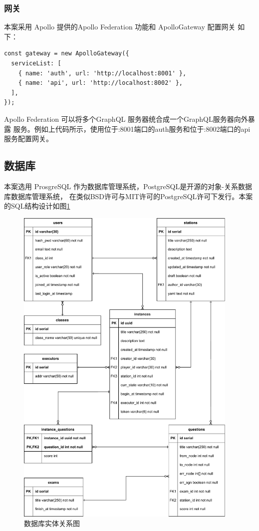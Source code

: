 \subsubsection{网关}
本案采用 Apollo 提供的Apollo Federation 功能和 ApolloGateway 配置网关
如下：

\begin{lstlisting}
const gateway = new ApolloGateway({
  serviceList: [
    { name: 'auth', url: 'http://localhost:8001' },
    { name: 'api', url: 'http://localhost:8002' },
  ],
});
\end{lstlisting}

Apollo Federation 可以将多个GraphQL 服务器统合成一个GraphQL服务器向外暴露
服务。例如上代码所示，使用位于:8001端口的auth服务和位于:8002端口的api服务配置网关。



\subsection{数据库}
本案选用 ProsgreSQL 作为数据库管理系统，PostgreSQL是开源的对象-关系数据库数据库管理系统，
在类似BSD许可与MIT许可的PostgreSQL许可下发行。本案的SQL结构设计如图\ref{erd}

\begin{figure}[htbp!]
    \centering
    \includegraphics[width=0.95\textwidth]{figures/pdf/erd.pdf}
    \caption{\label{erd}数据库实体关系图}
\end{figure}

